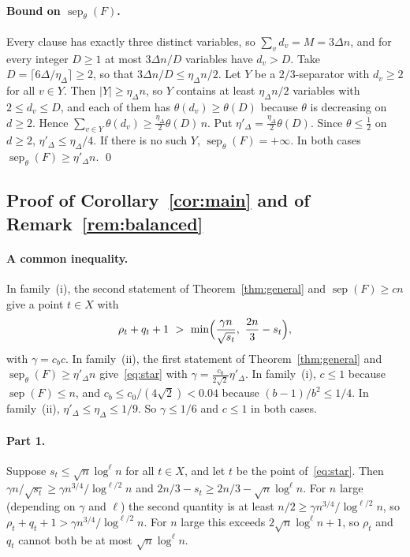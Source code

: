 \documentclass[11pt,a4paper]{article}
\theoremstyle{definition}
\theoremstyle{remark}
\newcommand{\sep}{\operatorname{sep}}
\newcommand{\sepw}{\operatorname{sep}_{\theta}}
\begin{document}
\paragraph{Bound on $\sepw(F)$.} Every clause has exactly three distinct variables, so
$\sum_vd_v=M=3\Delta n$, and for every integer $D\ge1$ at most $3\Delta n/D$ variables have
$d_v>D$. Take $D=\lceil6\Delta/\eta_\Delta\rceil\ge2$, so that $3\Delta n/D\le\eta_\Delta n/2$.
Let $Y$ be a $2/3$-separator with $d_v\ge2$ for all $v\in Y$. Then $|Y|\ge\eta_\Delta n$, so
$Y$ contains at least $\eta_\Delta n/2$ variables with $2\le d_v\le D$, and each of them has
$\theta(d_v)\ge\theta(D)$ because $\theta$ is decreasing on $d\ge2$. Hence
$\sum_{v\in Y}\theta(d_v)\ge\frac{\eta_\Delta}{2}\theta(D)\,n$. Put
$\eta'_\Delta=\frac{\eta_\Delta}{2}\theta(D)$. Since $\theta\le\frac12$ on $d\ge2$,
$\eta'_\Delta\le\eta_\Delta/4$. If there is no such $Y$, $\sepw(F)=+\infty$. In both cases
$\sepw(F)\ge\eta'_\Delta n$. \qed

\subsection{Proof of Corollary~\ref{cor:main} and of Remark~\ref{rem:balanced}}
\label{sec:proofcor}

\paragraph{A common inequality.} In family~(i), the second statement of
Theorem~\ref{thm:general} and $\sep(F)\ge cn$ give a point $t\in X$ with
\begin{equation}\label{eq:star}
\rho_t+q_t+1\ >\ \min\Bigl(\frac{\gamma n}{\sqrt{s_t}},\ \frac{2n}{3}-s_t\Bigr),
\end{equation}
with $\gamma=c_bc$. In family~(ii), the first statement of Theorem~\ref{thm:general} and
$\sepw(F)\ge\eta'_\Delta n$ give~\eqref{eq:star} with
$\gamma=\frac{c_0}{2\sqrt2}\eta'_\Delta$. In family~(i), $c\le1$ because $\sep(F)\le n$, and
$c_b\le c_0/(4\sqrt2)<0.04$ because $(b-1)/b^2\le1/4$. In family~(ii),
$\eta'_\Delta\le\eta_\Delta\le1/9$. So $\gamma\le1/6$ and $c\le1$ in both cases.

\paragraph{Part 1.} Suppose $s_t\le\sqrt n\log^\ell n$ for all $t\in X$, and let $t$ be the
point of~\eqref{eq:star}. Then
$\gamma n/\sqrt{s_t}\ge\gamma n^{3/4}/\log^{\ell/2}n$ and
$2n/3-s_t\ge2n/3-\sqrt n\log^\ell n$. For $n$ large (depending on $\gamma$ and $\ell$) the
second quantity is at least $n/2\ge\gamma n^{3/4}/\log^{\ell/2}n$, so
$\rho_t+q_t+1>\gamma n^{3/4}/\log^{\ell/2}n$. For $n$ large this exceeds
$2\sqrt n\log^\ell n+1$, so $\rho_t$ and $q_t$ cannot both be at most $\sqrt n\log^\ell n$.
\end{document}

